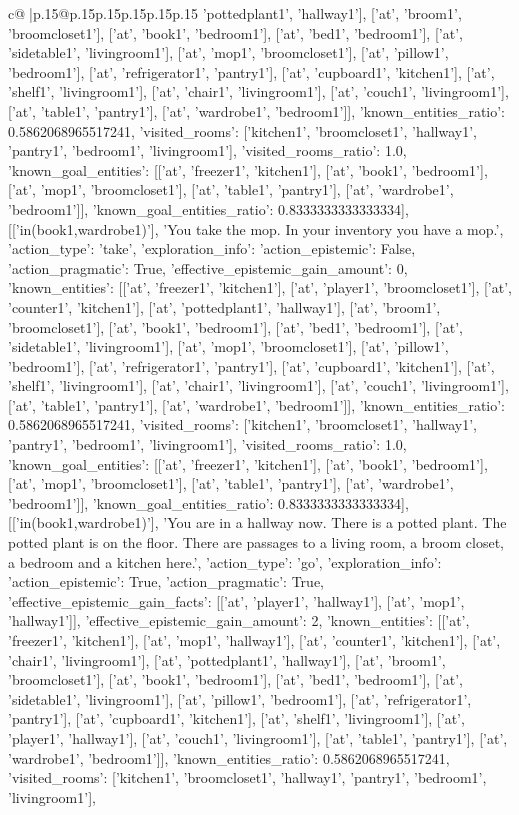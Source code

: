 \documentclass{article}
\begin{document}
{\begin{supertabular}{c@{$\;$}|p{.15\linewidth}@{}p{.15\linewidth}p{.15\linewidth}p{.15\linewidth}p{.15\linewidth}p{.15\linewidth}}
{{{'pottedplant1', 'hallway1'], ['at', 'broom1', 'broomcloset1'], ['at', 'book1', 'bedroom1'], ['at', 'bed1', 'bedroom1'], ['at', 'sidetable1', 'livingroom1'], ['at', 'mop1', 'broomcloset1'], ['at', 'pillow1', 'bedroom1'], ['at', 'refrigerator1', 'pantry1'], ['at', 'cupboard1', 'kitchen1'], ['at', 'shelf1', 'livingroom1'], ['at', 'chair1', 'livingroom1'], ['at', 'couch1', 'livingroom1'], ['at', 'table1', 'pantry1'], ['at', 'wardrobe1', 'bedroom1']], 'known_entities_ratio': 0.5862068965517241, 'visited_rooms': ['kitchen1', 'broomcloset1', 'hallway1', 'pantry1', 'bedroom1', 'livingroom1'], 'visited_rooms_ratio': 1.0, 'known_goal_entities': [['at', 'freezer1', 'kitchen1'], ['at', 'book1', 'bedroom1'], ['at', 'mop1', 'broomcloset1'], ['at', 'table1', 'pantry1'], ['at', 'wardrobe1', 'bedroom1']], 'known_goal_entities_ratio': 0.8333333333333334}}], [['in(book1,wardrobe1)'], 'You take the mop. In your inventory you have a mop.', {'action_type': 'take', 'exploration_info': {'action_epistemic': False, 'action_pragmatic': True, 'effective_epistemic_gain_amount': 0, 'known_entities': [['at', 'freezer1', 'kitchen1'], ['at', 'player1', 'broomcloset1'], ['at', 'counter1', 'kitchen1'], ['at', 'pottedplant1', 'hallway1'], ['at', 'broom1', 'broomcloset1'], ['at', 'book1', 'bedroom1'], ['at', 'bed1', 'bedroom1'], ['at', 'sidetable1', 'livingroom1'], ['at', 'mop1', 'broomcloset1'], ['at', 'pillow1', 'bedroom1'], ['at', 'refrigerator1', 'pantry1'], ['at', 'cupboard1', 'kitchen1'], ['at', 'shelf1', 'livingroom1'], ['at', 'chair1', 'livingroom1'], ['at', 'couch1', 'livingroom1'], ['at', 'table1', 'pantry1'], ['at', 'wardrobe1', 'bedroom1']], 'known_entities_ratio': 0.5862068965517241, 'visited_rooms': ['kitchen1', 'broomcloset1', 'hallway1', 'pantry1', 'bedroom1', 'livingroom1'], 'visited_rooms_ratio': 1.0, 'known_goal_entities': [['at', 'freezer1', 'kitchen1'], ['at', 'book1', 'bedroom1'], ['at', 'mop1', 'broomcloset1'], ['at', 'table1', 'pantry1'], ['at', 'wardrobe1', 'bedroom1']], 'known_goal_entities_ratio': 0.8333333333333334}}], [['in(book1,wardrobe1)'], 'You are in a hallway now. There is a potted plant. The potted plant is on the floor. There are passages to a living room, a broom closet, a bedroom and a kitchen here.', {'action_type': 'go', 'exploration_info': {'action_epistemic': True, 'action_pragmatic': True, 'effective_epistemic_gain_facts': [['at', 'player1', 'hallway1'], ['at', 'mop1', 'hallway1']], 'effective_epistemic_gain_amount': 2, 'known_entities': [['at', 'freezer1', 'kitchen1'], ['at', 'mop1', 'hallway1'], ['at', 'counter1', 'kitchen1'], ['at', 'chair1', 'livingroom1'], ['at', 'pottedplant1', 'hallway1'], ['at', 'broom1', 'broomcloset1'], ['at', 'book1', 'bedroom1'], ['at', 'bed1', 'bedroom1'], ['at', 'sidetable1', 'livingroom1'], ['at', 'pillow1', 'bedroom1'], ['at', 'refrigerator1', 'pantry1'], ['at', 'cupboard1', 'kitchen1'], ['at', 'shelf1', 'livingroom1'], ['at', 'player1', 'hallway1'], ['at', 'couch1', 'livingroom1'], ['at', 'table1', 'pantry1'], ['at', 'wardrobe1', 'bedroom1']], 'known_entities_ratio': 0.5862068965517241, 'visited_rooms': ['kitchen1', 'broomcloset1', 'hallway1', 'pantry1', 'bedroom1', 'livingroom1'], }}}
\end{supertabular}}
\end{document}
